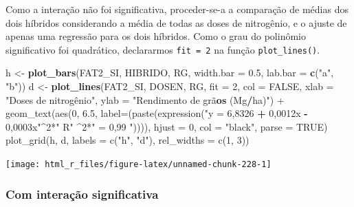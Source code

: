 \documentclass[
]{book}
\newenvironment{Shaded}{\begin{snugshade}}{\end{snugshade}}
\newcommand{\DataTypeTok}[1]{\textcolor[rgb]{0.13,0.29,0.53}{#1}}
\newcommand{\DecValTok}[1]{\textcolor[rgb]{0.00,0.00,0.81}{#1}}
\newcommand{\FloatTok}[1]{\textcolor[rgb]{0.00,0.00,0.81}{#1}}
\newcommand{\KeywordTok}[1]{\textcolor[rgb]{0.13,0.29,0.53}{\textbf{#1}}}
\newcommand{\NormalTok}[1]{#1}
\newcommand{\OperatorTok}[1]{\textcolor[rgb]{0.81,0.36,0.00}{\textbf{#1}}}
\newcommand{\OtherTok}[1]{\textcolor[rgb]{0.56,0.35,0.01}{#1}}
\newcommand{\StringTok}[1]{\textcolor[rgb]{0.31,0.60,0.02}{#1}}
\begin{document}

Como a interação não foi significativa, proceder-se-a a comparação de médias dos dois híbridos considerando a média de todas as doses de nitrogênio, e o ajuste de apenas uma regressão para os dois híbridos. Como o grau do polinômio significativo foi quadrático, declararmos \texttt{fit\ =\ 2} na função \texttt{plot\_lines()}.

\begin{Shaded}
\begin{Highlighting}[]
\NormalTok{h <-}\StringTok{ }\KeywordTok{plot_bars}\NormalTok{(FAT2_SI, HIBRIDO, RG,}
                 \DataTypeTok{width.bar =} \FloatTok{0.5}\NormalTok{,}
                 \DataTypeTok{lab.bar =} \KeywordTok{c}\NormalTok{(}\StringTok{"a"}\NormalTok{, }\StringTok{"b"}\NormalTok{))}
\NormalTok{d <-}\StringTok{ }\KeywordTok{plot_lines}\NormalTok{(FAT2_SI, DOSEN, RG,}
                \DataTypeTok{fit =} \DecValTok{2}\NormalTok{,}
                \DataTypeTok{col =} \OtherTok{FALSE}\NormalTok{,}
                \DataTypeTok{xlab =} \StringTok{"Doses de nitrogênio",}
\StringTok{                ylab = "}\NormalTok{Rendimento de grã}\KeywordTok{os}\NormalTok{ (Mg}\OperatorTok{/}\NormalTok{ha)}\StringTok{") +}
\StringTok{     geom_text(aes(0, 6.5, label=(paste(expression("}\DataTypeTok{y =} \DecValTok{6}\NormalTok{,}\DecValTok{8326} \OperatorTok{+}\StringTok{ }\DecValTok{0}\NormalTok{,0012x }\OperatorTok{-}\StringTok{ }\DecValTok{0}\NormalTok{,0003x}\StringTok{"^2*"}\NormalTok{  R}\StringTok{" ^2*"}\NormalTok{ =}\StringTok{ }\DecValTok{0}\NormalTok{,}\DecValTok{99} \StringTok{")))),}
\StringTok{               hjust = 0,}
\StringTok{               col = "}\NormalTok{black}\StringTok{",}
\StringTok{               parse = TRUE) }
\StringTok{plot_grid(h, d, labels = c("}\NormalTok{h}\StringTok{", "}\NormalTok{d}\StringTok{"), rel_widths = c(1, 3))}
\end{Highlighting}
\end{Shaded}

\begin{center}\texttt{[image: html\_r\_files/figure-latex/unnamed-chunk-228-1]} \end{center}

\hypertarget{com-interauxe7uxe3o-significativa-1}{%
\subsubsection{Com interação significativa}\label{com-interauxe7uxe3o-significativa-1}}
\end{document}
